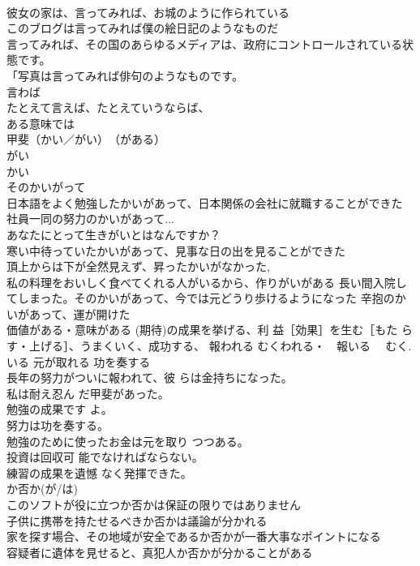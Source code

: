 \documentclass[8pt]{extreport}
\begin{document}
\begin{CJK}{UTF8}{min}
\\	彼女の家は、言ってみれば、お城のように作られている 
\\	このブログは言ってみれば僕の絵日記のようなものだ 
\\	言ってみれば、その国のあらゆるメディアは、政府にコントロールされている状態です。 
\\	「写真は言ってみれば俳句のようなものです。
\\	言わば 
\\	たとえて言えば、たとえていうならば、
\\	ある意味では
\\	甲斐（かい／がい）　（がある） 
\\	がい 
\\	かい 
\\	そのかいがって	
\\	日本語をよく勉強したかいがあって、日本関係の会社に就職することができた 社員一同の努力のかいがあって... 
\\	あなたにとって生きがいとはなんですか？ 
\\	寒い中待っていたかいがあって、見事な日の出を見ることができた
\\	頂上からは下が全然見えず、昇ったかいがなかった, 
\\	私の料理をおいしく食べてくれる人がいるから、作りがいがある 長い間入院してしまった。そのかいがあって、今では元どうり歩けるようになった 辛抱のかいがあって、運が開けた 
\\	価値がある・意味がある (期待)の成果を挙げる、利 益［効果］を生む［もた らす・上げる］、うまくいく、成功する、 報われる むくわれる・　報いる　 むく.いる 元が取れる 功を奏する 
\\	長年の努力がついに報われて、彼 らは金持ちになった。 
\\	私は耐え忍ん だ甲斐があった。 
\\	勉強の成果です よ。 
\\	努力は功を奏する。 
\\	勉強のために使ったお金は元を取り つつある。 
\\	投資は回収可 能でなければならない。 
\\	練習の成果を遺憾 なく発揮できた。
\\	か否か(が/は)	
\\	このソフトが役に立つか否かは保証の限りではありません 
\\	子供に携帯を持たせるべきか否かは議論が分かれる 
\\	家を探す場合、その地域が安全であるか否かが一番大事なポイントになる 
\\	容疑者に遺体を見せると、真犯人か否かが分かることがある 

\end{CJK}
\end{document}
